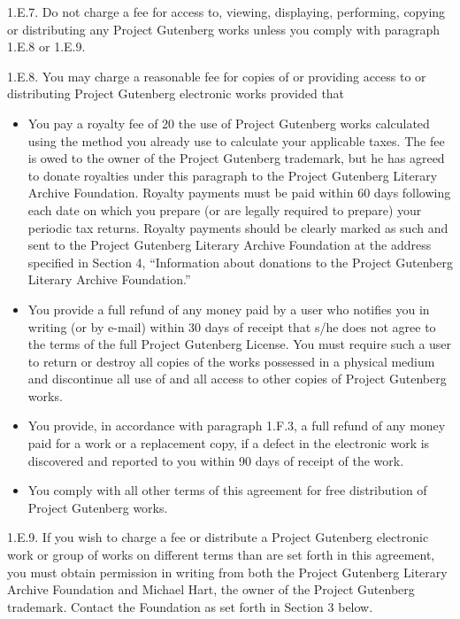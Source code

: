 1.E.7.  Do not charge a fee for access to, viewing, displaying,
performing, copying or distributing any Project Gutenberg\texttrademark{} works
unless you comply with paragraph 1.E.8 or 1.E.9.

1.E.8.  You may charge a reasonable fee for copies of or providing
access to or distributing Project Gutenberg\texttrademark{} electronic works provided
that
\begin{itemize}
  \item You pay a royalty fee of 20%
     the use of Project Gutenberg\texttrademark{} works calculated using the method
     you already use to calculate your applicable taxes.  The fee is
     owed to the owner of the Project Gutenberg\texttrademark{} trademark, but he
     has agreed to donate royalties under this paragraph to the
     Project Gutenberg Literary Archive Foundation.  Royalty payments
     must be paid within 60 days following each date on which you
     prepare (or are legally required to prepare) your periodic tax
     returns.  Royalty payments should be clearly marked as such and
     sent to the Project Gutenberg Literary Archive Foundation at the
     address specified in Section 4, ``Information about donations to
     the Project Gutenberg Literary Archive Foundation.''

  \item You provide a full refund of any money paid by a user who notifies
     you in writing (or by e-mail) within 30 days of receipt that s/he
     does not agree to the terms of the full Project Gutenberg\texttrademark{}
     License.  You must require such a user to return or
     destroy all copies of the works possessed in a physical medium
     and discontinue all use of and all access to other copies of
     Project Gutenberg\texttrademark{} works.

  \item You provide, in accordance with paragraph 1.F.3, a full refund of any
     money paid for a work or a replacement copy, if a defect in the
     electronic work is discovered and reported to you within 90 days
     of receipt of the work.

  \item You comply with all other terms of this agreement for free
     distribution of Project Gutenberg\texttrademark{} works.
\end{itemize}

1.E.9.  If you wish to charge a fee or distribute a Project Gutenberg\texttrademark{}
electronic work or group of works on different terms than are set
forth in this agreement, you must obtain permission in writing from
both the Project Gutenberg Literary Archive Foundation and Michael
Hart, the owner of the Project Gutenberg\texttrademark{} trademark.  Contact the
Foundation as set forth in Section 3 below.

